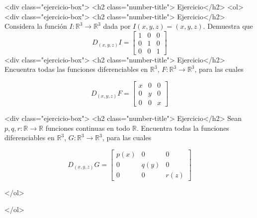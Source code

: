\documentclass{article}
\theoremstyle{definition}
\begin{document}
  <div class="ejercicio-box"> <h2 class="number-title"> Ejercicio</h2>
    <ol>
    <div class="ejercicio-box"> <h2 class="number-title"> Ejercicio</h2> Considera la función $I:\mathbb{R}^3\to \mathbb{R}^3$ dada por $I(x,y,z)=(x,y,z)$.
      Demuestra que
      $$
      D_{(x,y,z)}I=\left[
        \begin{array}{ccc}
          1 & 0 & 0 \\
          0 & 1 & 0 \\
          0 & 0 & 1
        \end{array}
      \right]
      $$
    <div class="ejercicio-box"> <h2 class="number-title"> Ejercicio</h2> Encuentra todas las funciones diferenciables en $\mathbb{R}^3$,
      $F:\mathbb{R}^3 \to \mathbb{R}^3$, para las cuales

      $$
      D_{(x,y,z)}F=\left[
        \begin{array}{ccc}
          x & 0 & 0 \\
          0 & y & 0 \\
          0 & 0 & x
        \end{array}
      \right]
      $$

    <div class="ejercicio-box"> <h2 class="number-title"> Ejercicio</h2> Sean $p,q,r:\mathbb{R}\to \mathbb{R}$ funciones continuas en todo $\mathbb{R}$. Encuentra
      todas la funciones diferenciables en $\mathbb{R}^3$, $G:\mathbb{R}^3 \to \mathbb{R}^3$, para
      las cuales

      $$
      D_{(x,y,z)}G=\left[
        \begin{array}{ccc}
          p(x) & 0 & 0 \\
          0 & q(y) & 0 \\
          0 & 0 & r(z)
        \end{array}
      \right]
      $$

      
    </ol>

    </ol>

       
\end{document}
